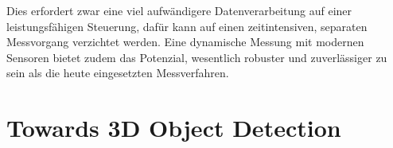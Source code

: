 Dies erfordert zwar eine viel aufwändigere Datenverarbeitung auf einer leistungsfähigen Steuerung, dafür kann auf einen 
zeitintensiven, separaten Messvorgang verzichtet werden. Eine dynamische Messung mit modernen Sensoren bietet zudem das Potenzial, wesentlich robuster und zuverlässiger zu sein als die heute eingesetzten Messverfahren.
    
    
    
    

\section{Towards 3D Object Detection}
\lipsum[2-5]

        
        

